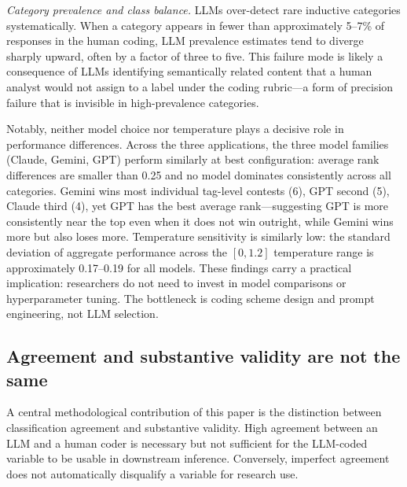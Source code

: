\documentclass[11pt]{article}
\begin{document}
\begin{sloppypar}
\textit{Category prevalence and class balance.} LLMs over-detect rare inductive categories systematically. When a category appears in fewer than approximately 5--7\% of responses in the human coding, LLM prevalence estimates tend to diverge sharply upward, often by a factor of three to five. This failure mode is likely a consequence of LLMs identifying semantically related content that a human analyst would not assign to a label under the coding rubric---a form of precision failure that is invisible in high-prevalence categories.


Notably, neither model choice nor temperature plays a decisive role in performance differences. Across the three applications, the three model families (Claude, Gemini, GPT) perform similarly at best configuration: average rank differences are smaller than 0.25 and no model dominates consistently across all categories. Gemini wins most individual tag-level contests (6), GPT second (5), Claude third (4), yet GPT has the best average rank---suggesting GPT is more consistently near the top even when it does not win outright, while Gemini wins more but also loses more. Temperature sensitivity is similarly low: the standard deviation of aggregate performance across the $[0, 1.2]$ temperature range is approximately 0.17--0.19 for all models. These findings carry a practical implication: researchers do not need to invest in model comparisons or hyperparameter tuning. The bottleneck is coding scheme design and prompt engineering, not LLM selection.

\subsection*{Agreement and substantive validity are not the same}

A central methodological contribution of this paper is the distinction between classification agreement and substantive validity. High agreement between an LLM and a human coder is necessary but not sufficient for the LLM-coded variable to be usable in downstream inference. Conversely, imperfect agreement does not automatically disqualify a variable for research use.


\end{sloppypar}
\end{document}

